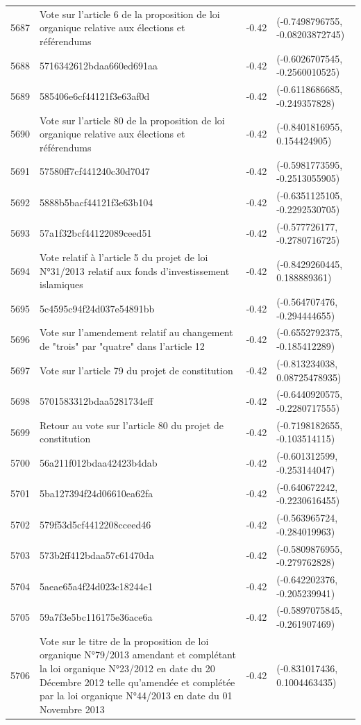 \begin{table}[ht]
\begin{tabular}{rlrl}
  5687 & Vote sur l'article 6 de la proposition de loi organique relative aux élections et référendums & -0.42 & (-0.7498796755, -0.08203872745) \\ 
  5688 & 5716342612bdaa660ed691aa & -0.42 & (-0.6026707545, -0.2560010525) \\ 
  5689 & 585406e6cf44121f3e63af0d & -0.42 & (-0.6118686685, -0.249357828) \\ 
  5690 & Vote sur l'article 80 de la proposition de loi organique relative aux élections et référendums & -0.42 & (-0.8401816955, 0.154424905) \\ 
  5691 & 57580ff7cf441240c30d7047 & -0.42 & (-0.5981773595, -0.2513055905) \\ 
  5692 & 5888b5bacf44121f3e63b104 & -0.42 & (-0.6351125105, -0.2292530705) \\ 
  5693 & 57a1f32bcf44122089ceed51 & -0.42 & (-0.577726177, -0.2780716725) \\ 
  5694 & Vote relatif à l'article 5 du projet de loi N°31/2013 relatif aux fonds d'investissement islamiques & -0.42 & (-0.8429260445, 0.188889361) \\ 
  5695 & 5c4595c94f24d037e54891bb & -0.42 & (-0.564707476, -0.294444655) \\ 
  5696 & Vote sur l'amendement relatif au changement de "trois" par "quatre" dans l'article 12 & -0.42 & (-0.6552792375, -0.185412289) \\ 
  5697 & Vote sur l'article 79 du projet de constitution & -0.42 & (-0.813234038, 0.08725478935) \\ 
  5698 & 5701583312bdaa5281734eff & -0.42 & (-0.6440920575, -0.2280717555) \\ 
  5699 & Retour au vote sur l'article 80 du projet de constitution & -0.42 & (-0.7198182655, -0.103514115) \\ 
  5700 & 56a211f012bdaa42423b4dab & -0.42 & (-0.601312599, -0.253144047) \\ 
  5701 & 5ba127394f24d06610ea62fa & -0.42 & (-0.640672242, -0.2230616455) \\ 
  5702 & 579f53d5cf4412208cceed46 & -0.42 & (-0.563965724, -0.284019963) \\ 
  5703 & 573b2ff412bdaa57c61470da & -0.42 & (-0.5809876955, -0.279762828) \\ 
  5704 & 5aeae65a4f24d023c18244e1 & -0.42 & (-0.642202376, -0.205239941) \\ 
  5705 & 59a7f3e5bc116175e36ace6a & -0.42 & (-0.5897075845, -0.261907469) \\ 
  5706 & Vote sur le titre de la proposition de loi organique N°79/2013 amendant et complétant la loi organique N°23/2012 en date du 20 Décembre 2012 telle qu'amendée et complétée par la loi organique N°44/2013 en date du 01 Novembre 2013 & -0.42 & (-0.831017436, 0.1004463435) \\ 

\end{tabular}
\end{table}
